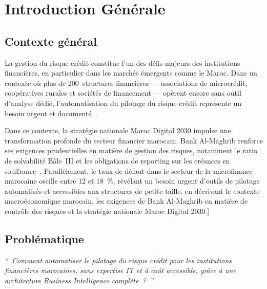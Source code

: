 \documentclass[12pt, a4paper]{report}
\begin{document}
\tableofcontents

\setcounter{page}{1}

\chapter*{Introduction G\'en\'erale}

\section*{Contexte g\'en\'eral}

La gestion du risque cr\'edit constitue l'un des d\'efis majeurs des institutions
financi\`eres, en particulier dans les march\'es \'emergents comme le Maroc.
Dans un contexte o\`u plus de 200~structures financi\`eres --- associations de
microcr\'edit, coop\'eratives rurales et soci\'et\'es de financement --- op\`erent
encore sans outil d'analyse d\'edi\'e, l'automatisation du pilotage du risque
cr\'edit repr\'esente un besoin urgent et document\'e~\cite{bam_rapport,fnam}.

Dans ce contexte, la stratégie nationale Maroc Digital 2030 impulse une transformation profonde du secteur financier marocain. Bank Al-Maghrib renforce ses exigences prudentielles en matière de gestion des risques, notamment le ratio de solvabilité Bâle~III et les obligations de reporting sur les créances en souffrance~\cite{bam_rapport}. Parallèlement, le taux de défaut dans le secteur de la microfinance marocaine oscille entre 12 et 18~\%, révélant un besoin urgent d'outils de pilotage automatisés et accessibles aux structures de petite taille. en d\'ecrivant le contexte macro\'economique marocain,
les exigences de Bank Al-Maghrib en mati\`ere de contr\^ole des risques et la
strat\'egie nationale Maroc Digital 2030.]

\section*{Probl\'ematique}

\begin{tcolorbox}[problembox,title={Probl\'ematique centrale}]
\textit{``~Comment automatiser le pilotage du risque cr\'edit pour les
institutions financi\`eres marocaines, sans expertise IT et \`a co\^ut accessible,
gr\^ace \`a une architecture Business Intelligence compl\`ete~?~''}
\end{tcolorbox}
\end{document}
